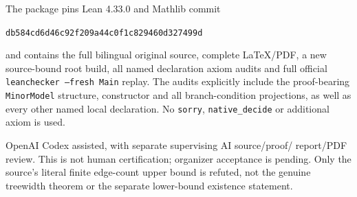 \documentclass[11pt]{article}
\begin{document}
The package pins Lean 4.33.0 and Mathlib commit
\begin{center}\small\texttt{db584cd6d46c92f209a44c0f1c829460d327499d}\end{center}
and contains the full bilingual original source, complete
LaTeX/PDF, a new source-bound root build, all named declaration
axiom audits and full official
\texttt{leanchecker --fresh Main} replay. The audits explicitly
include the proof-bearing \texttt{MinorModel} structure,
constructor and all branch-condition projections, as well as
every other named local declaration. No \texttt{sorry},
\texttt{native\_decide} or additional axiom is used.

OpenAI Codex assisted, with separate supervising AI source/proof/
report/PDF review. This is not human certification; organizer
acceptance is pending. Only the source's literal finite
edge-count upper bound is refuted, not the genuine treewidth
theorem or the separate lower-bound existence statement.
\end{document}
